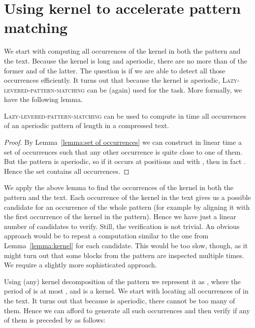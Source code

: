\documentclass[runningheads]{llncs}
\newcommand{\proc}[1]{\textnormal{\scshape#1}}
\begin{document}
\section{Using kernel to accelerate pattern matching}
\label{section:kernel}

We start with computing all occurrences of the kernel in both the pattern and the text. Because the kernel is long and aperiodic, there are no more than  of the former and  of the latter. The question is if we are able to detect all those occurrences efficiently. It turns out
that because the kernel is aperiodic, \proc{Lazy-levered-pattern-matching} can be (again) used for the task. More formally, we have the following
lemma.

\begin{lemma}\label{lemma:aperiodic}
\proc{Lazy-levered-pattern-matching} can be used to compute in  time all occurrences of an aperiodic pattern of length  in a compressed text. 
\end{lemma}

\begin{proof}
By Lemma~\ref{lemma:set of occurrences} we can construct in linear time a set of occurrences such that any other occurrence is quite close to one of them. But the pattern is aperiodic, so if it occurs at positions  and  with , then in fact . Hence the set contains all occurrences.
\end{proof}

We apply the above lemma to find the occurrences of the kernel in both the pattern and the text. Each occurrence of the kernel in the text gives us a 
possible candidate for an occurrence of the whole pattern (for example by aligning it with the first occurrence of the kernel in the pattern). Hence
we have just a linear number of candidates to verify. Still, the verification is not trivial. An obvious approach would be to repeat a computation
similar to the one from Lemma~\ref{lemma:kernel} for each candidate. This would be too slow, though, as it might turn out that some blocks from the pattern are inspected multiple times. We require a slightly more sophisticated approach.



Using (any) kernel decomposition of the pattern we represent it as , where the period of  is at most , and
 is a kernel. We start with locating all occurrences of  in the text. It turns out that because  is aperiodic, there cannot
be too many of them. Hence we can afford to generate all such occurrences and then verify if any of them is preceded by  as follows:
\end{document}

